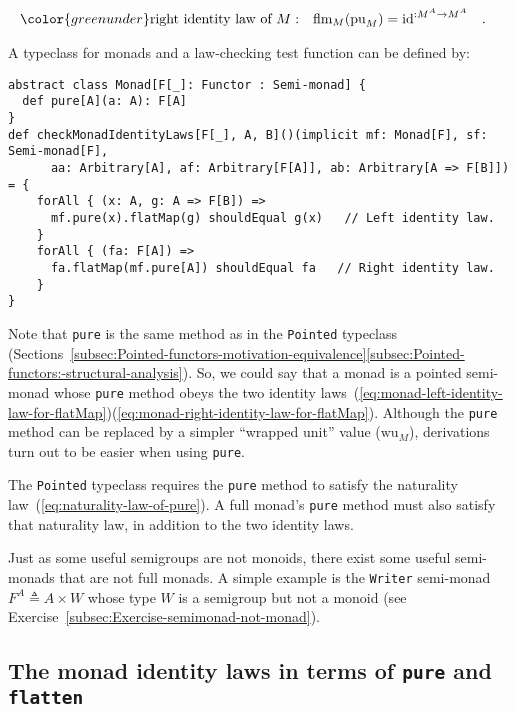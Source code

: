 ~\vspace{-1.4\baselineskip}
\begin{align}
{\color{greenunder}\text{right identity law of }M:}\quad & \text{flm}_{M}(\text{pu}_{M})=\text{id}^{:M^{A}\rightarrow M^{A}}\quad.\label{eq:monad-right-identity-law-for-flatMap}
\end{align}

A typeclass for monads and
a law-checking test function can be defined by:
\begin{lstlisting}
abstract class Monad[F[_]: Functor : Semi-monad] {
  def pure[A](a: A): F[A]
}
def checkMonadIdentityLaws[F[_], A, B]()(implicit mf: Monad[F], sf: Semi-monad[F],
      aa: Arbitrary[A], af: Arbitrary[F[A]], ab: Arbitrary[A => F[B]]) = {
    forAll { (x: A, g: A => F[B]) =>               
      mf.pure(x).flatMap(g) shouldEqual g(x)   // Left identity law.
    }
    forAll { (fa: F[A]) =>               
      fa.flatMap(mf.pure[A]) shouldEqual fa   // Right identity law.
    }
}
\end{lstlisting}

Note that \lstinline!pure! is the same method as in the \lstinline!Pointed!
typeclass (Sections~\ref{subsec:Pointed-functors-motivation-equivalence}\textendash \ref{subsec:Pointed-functors:-structural-analysis}).
So, we could say that a monad is a pointed semi-monad whose \lstinline!pure!
method obeys the two identity laws~(\ref{eq:monad-left-identity-law-for-flatMap})\textendash (\ref{eq:monad-right-identity-law-for-flatMap}).
Although the \lstinline!pure! method can be replaced by a simpler
\textsf{``}wrapped unit\textsf{''} value ($\text{wu}_{M}$), derivations turn out
to be easier when using \lstinline!pure!.

The \lstinline!Pointed! typeclass requires the \lstinline!pure!
method to satisfy the naturality law~(\ref{eq:naturality-law-of-pure}).
A full monad\textsf{'}s \lstinline!pure! method must also satisfy that naturality
law, in addition to the two identity laws.

Just as some useful semigroups are not monoids, there exist some useful
semi-monads that are not full monads. A simple example is the \lstinline!Writer!
semi-monad $F^{A}\triangleq A\times W$ whose type $W$ is a semigroup
but not a monoid (see Exercise~\ref{subsec:Exercise-semimonad-not-monad}).

\subsection{The monad identity laws in terms of \texttt{pure} and \texttt{flatten}}


